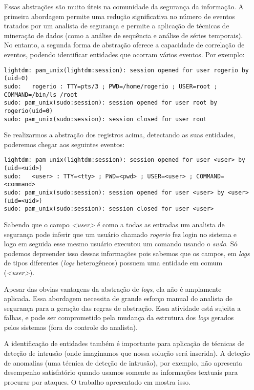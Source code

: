 \documentclass[
	12pt,				%
	openright,			%
	twoside,			%
	a4paper,			%
	english,			%
	spanish,			%
	brazil,				%
	]{abntex2}
\begin{document}
Essas abstrações são muito úteis na comunidade da segurança da informação. A primeira abordagem permite uma redução significativa no número de eventos tratados por um analista de segurança e permite a aplicação de técnicas de mineração de dados (como a análise de sequência e análise de séries temporais). No entanto, a segunda forma de abstração oferece a capacidade de correlação de eventos, podendo identificar entidades que ocorram vários eventos. Por exemplo:

{\small
\begin{verbatim}
lightdm: pam_unix(lightdm:session): session opened for user rogerio by (uid=0)
sudo:   rogerio : TTY=pts/3 ; PWD=/home/rogerio ; USER=root ; COMMAND=/bin/ls /root
sudo: pam_unix(sudo:session): session opened for user root by rogerio(uid=0)
sudo: pam_unix(sudo:session): session closed for user root
\end{verbatim}
}

Se realizarmos a abstração dos registros acima, detectando as suas entidades, poderemos chegar aos seguintes eventos:

{\small
\begin{verbatim}
lightdm: pam_unix(lightdm:session): session opened for user <user> by (uid=<uid>)
sudo:   <user> : TTY=<tty> ; PWD=<pwd> ; USER=<user> ; COMMAND=<command>
sudo: pam_unix(sudo:session): session opened for user <user> by <user>(uid=<uid>)
sudo: pam_unix(sudo:session): session closed for user <user>
\end{verbatim}
}

Sabendo que o campo \emph{<user>} é como a todas as entradas um analista de segurança pode inferir que um usuário chamado \emph{rogerio} fez login no sistema e logo em seguida esse mesmo usuário executou um comando usando o \emph{sudo}. Só podemos depreender isso dessas informações pois sabemos que os campos, em \emph{logs} de tipos diferentes (\emph{logs} heterogêneos) possuem uma entidade em comum (\emph{<user>}).

Apesar das obvias vantagens da abstração de \emph{logs}, ela não é amplamente aplicada. Essa abordagem necessita de grande esforço manual do analista de segurança para a geração das regras de abstração. Essa atividade está sujeita a falhas, e pode ser comprometido pela mudança da estrutura dos \emph{logs} gerados pelos sistemas (fora do controle do analista).

A identificação de entidades também é importante para aplicação de técnicas de deteção de intrusão (onde imaginamos que nossa solução será inserida). A deteção de anomalias (uma técnica de deteção de intrusão), por exemplo, não apresenta desempenho satisfatório quando usamos somente as informações textuais para procurar por ataques. O trabalho apresentado em \cite{li2013automatic} mostra isso.
\end{document}
